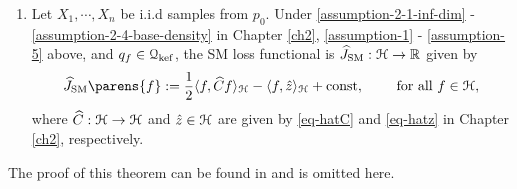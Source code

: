 \begin{theorem}
\begin{enumerate}[label=(\alph*)]
	\item Let $X_1, \cdots, X_n$ be i.i.d samples from $p_0$. Under \ref{assumption-2-1-inf-dim} - \ref{assumption-2-4-base-density} in Chapter \ref{ch2}, \ref{assumption-1} - \ref{assumption-5} above, and $q_f \in \mathcal{Q}_{\mathrm{kef}}$, the SM loss functional is $\widehat{J}_{\mathrm{SM}}: \mathcal{H} \to \mathbb{R}$ given by 
	\begin{equation*}%
		\widehat{J}_{\SM} \parens{f} := \frac{1}{2} \langle f, \widehat{C} f \rangle_{\mathcal{H}} - \langle f, \hat{z} \rangle_{\mathcal{H}} + \mathrm{const}, \qquad \text{ for all } f \in \calH, 
	\end{equation*}
	where $\widehat{C}: \mathcal{H} \to \mathcal{H}$ and $\hat{z} \in \mathcal{H}$ are given by \eqref{eq-hatC} and \eqref{eq-hatz} in Chapter \ref{ch2}, respectively.  
\end{enumerate}
\end{theorem}

The proof of this theorem can be found in \textcite{Sriperumbudur-density-estimation-inf-exp-family} and is omitted here. 

